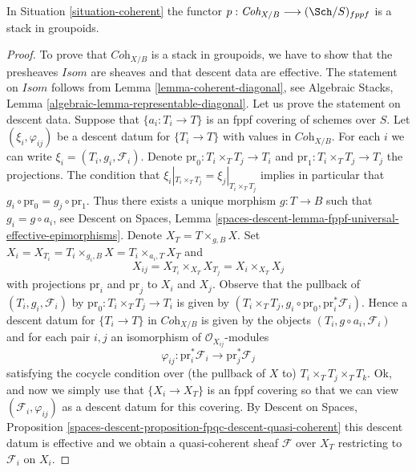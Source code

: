\begin{lemma}
\label{lemma-coherent-stack}
In Situation \ref{situation-coherent} the functor
$p : \textit{Coh}_{X/B} \longrightarrow (\Sch/S)_{fppf}$
is a stack in groupoids.
\end{lemma}

\begin{proof}
To prove that $\textit{Coh}_{X/B}$ is a stack in groupoids, we have to show
that the presheaves $\mathit{Isom}$ are sheaves and that descent data are
effective. The statement on $\mathit{Isom}$ follows from
Lemma \ref{lemma-coherent-diagonal}, see
Algebraic Stacks, Lemma \ref{algebraic-lemma-representable-diagonal}.
Let us prove the statement on descent data.
Suppose that $\{a_i : T_i \to T\}$ is an fppf covering of schemes over $S$.
Let $(\xi_i, \varphi_{ij})$ be a descent datum for $\{T_i \to T\}$
with values in $\textit{Coh}_{X/B}$.
For each $i$ we can write $\xi_i = (T_i, g_i, \mathcal{F}_i)$.
Denote $\text{pr}_0 : T_i \times_T T_j \to T_i$ and
$\text{pr}_1 : T_i \times_T T_j \to T_j$ the projections.
The condition that $\xi_i|_{T_i \times_T T_j} = \xi_j|_{T_i \times_T T_j}$
implies in particular that $g_i \circ \text{pr}_0 = g_j \circ \text{pr}_1$.
Thus there exists a unique morphism $g : T \to B$ such that
$g_i = g \circ a_i$, see
Descent on Spaces, Lemma
\ref{spaces-descent-lemma-fppf-universal-effective-epimorphisms}.
Denote $X_T = T \times_{g, B} X$. Set
$X_i = X_{T_i} = T_i \times_{g_i, B} X = T_i \times_{a_i, T} X_T$
and
$$
X_{ij} = X_{T_i} \times_{X_T} X_{T_j} = X_i \times_{X_T} X_j
$$
with projections $\text{pr}_i$ and $\text{pr}_j$ to $X_i$ and $X_j$.
Observe that the pullback of $(T_i, g_i, \mathcal{F}_i)$
by $\text{pr}_0 : T_i \times_T T_j \to T_i$ is given by
$(T_i \times_T T_j, g_i \circ \text{pr}_0, \text{pr}_i^*\mathcal{F}_i)$.
Hence a descent datum for $\{T_i \to T\}$ in $\textit{Coh}_{X/B}$
is given by the objects $(T_i, g \circ a_i, \mathcal{F}_i)$
and for each pair $i, j$ an isomorphism of $\mathcal{O}_{X_{ij}}$-modules
$$
\varphi_{ij} :
\text{pr}_i^*\mathcal{F}_i \longrightarrow \text{pr}_j^*\mathcal{F}_j
$$
satisfying the cocycle condition over (the pullback of $X$ to)
$T_i \times_T T_j \times_T T_k$.
Ok, and now we simply use that $\{X_i \to X_T\}$ is an fppf covering
so that we can view $(\mathcal{F}_i, \varphi_{ij})$ as a descent datum
for this covering. By
Descent on Spaces, Proposition
\ref{spaces-descent-proposition-fpqc-descent-quasi-coherent}
this descent datum is effective and we obtain a quasi-coherent
sheaf $\mathcal{F}$ over $X_T$ restricting to $\mathcal{F}_i$ on $X_i$.

\end{proof}
